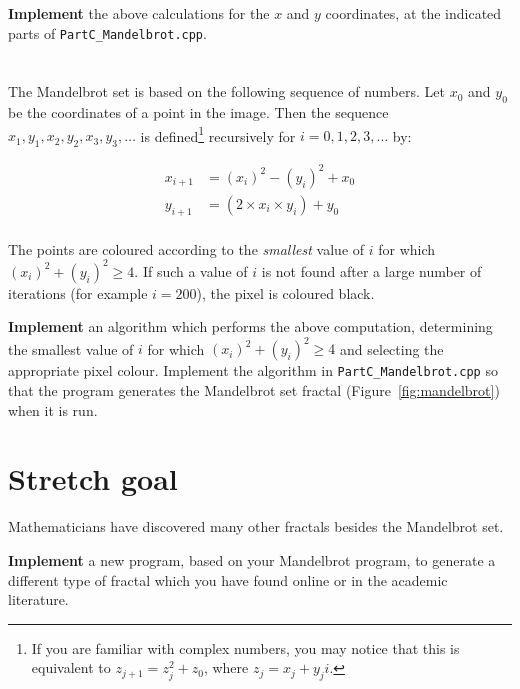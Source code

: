 \textbf{Implement} the above calculations for the $x$ and $y$ coordinates, at the indicated parts of \texttt{PartC\_Mandelbrot.cpp}.

\section{} \label{core-c-last}

The Mandelbrot set is based on the following sequence of numbers. Let $x_0$ and $y_0$ be the coordinates of a point in the image.
Then the sequence $x_1, y_1, x_2, y_2, x_3, y_3, \dots$ is defined\footnote{%
    If you are familiar with complex numbers, you may notice that this is equivalent to $z_{j+1} = z_j^2 + z_0$, where $z_j = x_j + y_j i$.
} recursively for $i = 0, 1, 2, 3, \dots$ by:

\begin{align*}
    x_{i+1} &= (x_i)^2 - (y_i)^2 + x_0 \\
    y_{i+1} &= (2 \times x_i \times y_i) + y_0 \\
\end{align*}

The points are coloured according to the \emph{smallest} value of $i$ for which $(x_i)^2 + (y_i)^2 \geq 4$.
If such a value of $i$ is not found after a large number of iterations (for example $i=200$), the pixel is coloured black.

\textbf{Implement} an algorithm which performs the above computation, determining the smallest value of $i$
for which $(x_i)^2 + (y_i)^2 \geq 4$ and selecting the appropriate pixel colour.
Implement the algorithm in \texttt{PartC\_Mandelbrot.cpp} so that the program generates the Mandelbrot set fractal (Figure~\ref{fig:mandelbrot}) when it is run.

\section{Stretch goal} \label{stretch-c}

Mathematicians have discovered many other fractals besides the Mandelbrot set.

\textbf{Implement} a new program, based on your Mandelbrot program,
to generate a different type of fractal which you have found online or in the academic literature.
